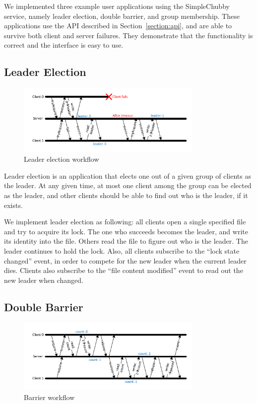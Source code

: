 We implemented three example user applications using the SimpleChubby service,
namely leader election, double barrier, and group membership.
These applications use the API described in Section~\ref{section:api},
and are able to survive both client and server failures. They demonstrate
that the functionality is correct and the interface is easy to use.

\subsection{Leader Election}

\begin{figure}
\centering
\includegraphics[width=0.8\textwidth]{leader_elect.pdf}
\caption{Leader election workflow}
\label{fig:leader_elect}
\end{figure}

Leader election is an application that elects one out of a given group
of clients as the leader. At any given time, at most one client among the
group can be elected as the leader, and other clients should be able to
find out who is the leader, if it exists.

We implement leader election as following: all clients open a single
specified file and try to acquire its lock. The one who succeeds becomes
the leader, and write its identity into the file. Others read the file
to figure out who is the leader. The leader continues to hold the lock.
Also, all clients subscribe to the ``lock state changed'' event, in order
to compete for the new leader when the current leader dies. Clients also
subscribe to the ``file content modified'' event to read out the new
leader when changed.

\subsection{Double Barrier}

\begin{figure}
\centering
\includegraphics[width=0.8\textwidth]{barrier.pdf}
\caption{Barrier workflow}
\label{fig:barrier}
\end{figure}

